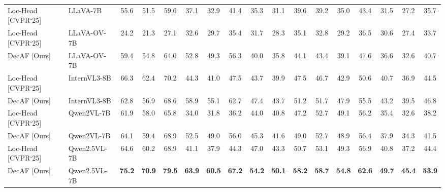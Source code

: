 \begin{table}[t!]
{\begin{tabular}{l l  ccc  ccc  ccc  ccc  ccc}
\\
\midrule \midrule
\rowcolor{needleGreen!25} Loc-Head {\scriptsize [CVPR`25]} & LLaVA-7B & 55.6 & 51.5 & 59.6 & 37.1 & 32.9 & 41.4 & 35.3 & 31.1 & 39.6 & 39.2 & 35.0 & 43.4 & 31.5 & 27.2 & 35.7
\\ \addlinespace[0.5ex]
\rowcolor{needleGreen!50} Loc-Head {\scriptsize [CVPR`25]} & LLaVA-OV-7B & 24.2 & 21.3 & 27.1 & 32.6 & 29.7 & 35.4 & 31.7 & 28.3 & 35.1 & 32.8 & 29.2 & 36.5 & 30.6 & 27.4 & 33.7
\\
\rowcolor{needleGreen!50} DecAF {\scriptsize [Ours]} & LLaVA-OV-7B & 59.4 & 54.8 & 64.0 & 52.8 & 49.3 & 56.3 & 40.0 & 35.8 & 44.1 & 43.4 & 39.1 & 47.6 & 36.6 & 32.6 & 40.7
\\ \addlinespace[0.5ex]
\rowcolor{longBlue!50} Loc-Head {\scriptsize [CVPR`25]} & InternVL3-8B & 66.3 & 62.4 & 70.2 & 44.3 & 41.0 & 47.5 & 43.7 & 39.9 & 47.5 & 46.7 & 42.9 & 50.6 & 40.7 & 36.9 & 44.5
\\
\rowcolor{longBlue!50} DecAF {\scriptsize [Ours]} & InternVL3-8B & 62.8 & 56.9 & 68.6 & 58.9 & 55.1 & 62.7 & 47.4 & 43.7 & 51.2 & 51.7 & 47.9 & 55.5 & 43.2 & 39.5 & 46.8
\\ \addlinespace[0.5ex]
\rowcolor{lavendar!30} Loc-Head {\scriptsize [CVPR`25]} & Qwen2VL-7B & 61.9 & 58.0 & 65.8 & 34.0 & 31.8 & 36.2 & 44.0 & 40.8 & 47.2 & 52.7 & 49.1 & 56.2 & 35.4 & 32.6 & 38.2
\\
\rowcolor{lavendar!30} DecAF {\scriptsize [Ours]} & Qwen2VL-7B & 64.1 & 59.4 & 68.9 & 52.5 & 49.0 & 56.0 & 45.3 & 41.6 & 49.0 & 52.7 & 48.9 & 56.4 & 37.9 & 34.3 & 41.5
\\ \addlinespace[0.5ex]
\rowcolor{lavendar!70} Loc-Head {\scriptsize [CVPR`25]} & Qwen2.5VL-7B & 64.6 & 60.2 & 68.9 & 41.1 & 37.9 & 44.3 & 47.0 & 43.3 & 50.7 & 53.1 & 49.3 & 56.9 & 40.8 & 37.2 & 44.4
\\
\rowcolor{lavendar!70} DecAF {\scriptsize [Ours]} & Qwen2.5VL-7B & \textbf{75.2} & \textbf{70.9} & \textbf{79.5} & \textbf{63.9} & \textbf{60.5} & \textbf{67.2} & \textbf{54.2} & \textbf{50.1} & \textbf{58.2} & \textbf{58.7} & \textbf{54.8} & \textbf{62.6} & \textbf{49.7} & \textbf{45.4} & \textbf{53.9}
\\
\bottomrule
\end{tabular}
}
\end{table}

